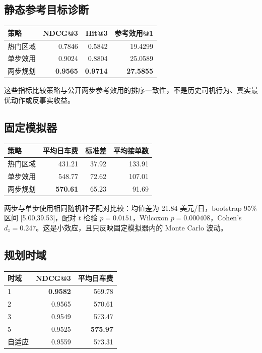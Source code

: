 \documentclass[11pt,a4paper]{ctexart}
\begin{document}
\subsection{静态参考目标诊断}

\begin{table}[h]
\centering
\begin{tabular}{lrrr}
\toprule
策略 & NDCG@3 & Hit@3 & 参考效用@1 \\
\midrule
热门区域 & 0.7846 & 0.5842 & 19.4299 \\
单步效用 & 0.9024 & 0.8804 & 25.0589 \\
两步规划 & \textbf{0.9565} & \textbf{0.9714} & \textbf{27.5855} \\
\bottomrule
\end{tabular}
\end{table}

这些指标比较策略与公开两步参考效用的排序一致性，不是历史司机行为、真实最优动作或反事实收益。

\subsection{固定模拟器}

\begin{table}[h]
\centering
\begin{tabular}{lrrr}
\toprule
策略 & 平均日车费 & 标准差 & 平均接单数 \\
\midrule
热门区域 & 431.21 & 37.92 & 133.91 \\
单步效用 & 548.77 & 72.62 & 107.01 \\
两步规划 & \textbf{570.61} & 65.23 & 91.69 \\
\bottomrule
\end{tabular}
\end{table}

两步与单步使用相同随机种子配对比较：均值差为 21.84 美元/日，bootstrap 95\% 区间 [5.00,39.53]，配对 $t$ 检验 $p=0.0151$，Wilcoxon $p=0.000408$，Cohen's $d_z=0.247$。这是小效应，且只反映固定模拟器内的 Monte Carlo 波动。

\subsection{规划时域}

\begin{table}[h]
\centering
\begin{tabular}{lrr}
\toprule
时域 & NDCG@3 & 平均日车费 \\
\midrule
1 & \textbf{0.9582} & 569.78 \\
2 & 0.9565 & 570.61 \\
3 & 0.9549 & 573.47 \\
5 & 0.9525 & \textbf{575.97} \\
自适应 & 0.9559 & 573.31 \\
\bottomrule
\end{tabular}
\end{table}
\end{document}
